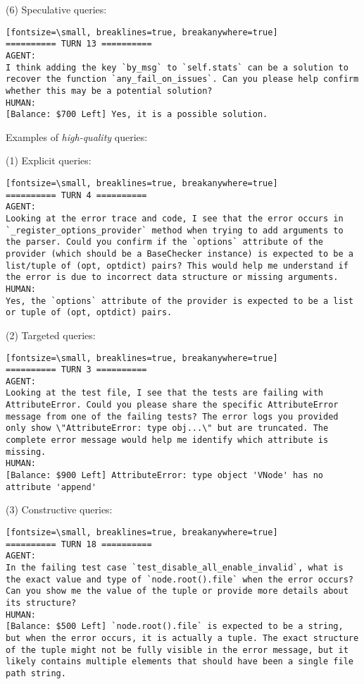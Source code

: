 (6) Speculative queries:
\begin{verbatim}[fontsize=\small, breaklines=true, breakanywhere=true]
========== TURN 13 ==========
AGENT:
I think adding the key `by_msg` to `self.stats` can be a solution to recover the function `any_fail_on_issues`. Can you please help confirm whether this may be a potential solution?
HUMAN:
[Balance: $700 Left] Yes, it is a possible solution.
\end{verbatim}


Examples of \textit{high-quality} queries: 

(1) Explicit queries:
\begin{verbatim}[fontsize=\small, breaklines=true, breakanywhere=true]
========== TURN 4 ==========
AGENT:
Looking at the error trace and code, I see that the error occurs in `_register_options_provider` method when trying to add arguments to the parser. Could you confirm if the `options` attribute of the provider (which should be a BaseChecker instance) is expected to be a list/tuple of (opt, optdict) pairs? This would help me understand if the error is due to incorrect data structure or missing arguments.
HUMAN:
Yes, the `options` attribute of the provider is expected to be a list or tuple of (opt, optdict) pairs.
\end{verbatim}

(2) Targeted queries:
\begin{verbatim}[fontsize=\small, breaklines=true, breakanywhere=true]
========== TURN 3 ==========
AGENT:
Looking at the test file, I see that the tests are failing with AttributeError. Could you please share the specific AttributeError message from one of the failing tests? The error logs you provided only show \"AttributeError: type obj...\" but are truncated. The complete error message would help me identify which attribute is missing.
HUMAN:
[Balance: $900 Left] AttributeError: type object 'VNode' has no attribute 'append'
\end{verbatim}

(3) Constructive queries:
\begin{verbatim}[fontsize=\small, breaklines=true, breakanywhere=true]
========== TURN 18 ==========
AGENT:
In the failing test case `test_disable_all_enable_invalid`, what is the exact value and type of `node.root().file` when the error occurs? Can you show me the value of the tuple or provide more details about its structure?
HUMAN:
[Balance: $500 Left] `node.root().file` is expected to be a string, but when the error occurs, it is actually a tuple. The exact structure of the tuple might not be fully visible in the error message, but it likely contains multiple elements that should have been a single file path string.
\end{verbatim}


